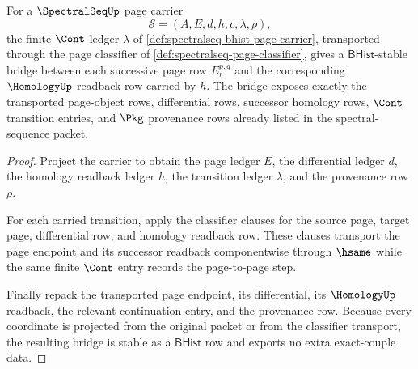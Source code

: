 \begin{theorem}
\label{thm:spectralseq-page-transition-bridge}
For a $\SpectralSeqUp$ page carrier
$$
\mathcal S=(A,E,d,h,c,\lambda,\rho),
$$
the finite $\Cont$ ledger $\lambda$ of
\autoref{def:spectralseq-bhist-page-carrier}, transported through the page
classifier of \autoref{def:spectralseq-page-classifier}, gives a
$\mathsf{BHist}$-stable bridge between each successive page row
$E_r^{p,q}$ and the corresponding $\HomologyUp$ readback row carried by $h$.
The bridge exposes exactly the transported page-object rows, differential
rows, successor homology rows, $\Cont$ transition entries, and $\Pkg$
provenance rows already listed in the spectral-sequence packet.
\end{theorem}
\begin{proof}
Project the carrier to obtain the page ledger $E$, the differential ledger
$d$, the homology readback ledger $h$, the transition ledger $\lambda$, and
the provenance row $\rho$.

For each carried transition, apply the classifier clauses for the source page,
target page, differential row, and homology readback row. These clauses
transport the page endpoint and its successor readback componentwise through
$\hsame$ while the same finite $\Cont$ entry records the page-to-page step.

Finally repack the transported page endpoint, its differential, its
$\HomologyUp$ readback, the relevant continuation entry, and the provenance
row. Because every coordinate is projected from the original packet or from
the classifier transport, the resulting bridge is stable as a
$\mathsf{BHist}$ row and exports no extra exact-couple data.
\end{proof}

